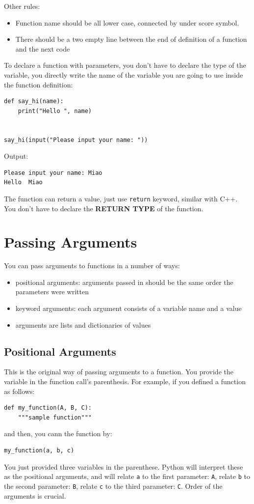 \documentclass[12pt]{book}
\begin{document}
Other rules:
\begin{itemize}
\item Function name should be all lower case, connected by under score symbol.
\item There should be a two empty line between the end of definition of a function and the next code
\end{itemize}

To declare a function with parameters, you don't have to declare the type of the variable, you directly write the name of the variable you are going to use inside the function definition:
\begin{verbatim}
def say_hi(name):
    print("Hello ", name)


say_hi(input("Please input your name: "))
\end{verbatim}
Output:
\begin{verbatim}
Please input your name: Miao
Hello  Miao
\end{verbatim}

The function can return a value, just use \texttt{return} keyword, similar with C++. You don't have to declare the \textbf{RETURN TYPE} of the function.
\section{Passing Arguments}
\label{sec:org0814f89}
You can pass arguments to functions in a number of ways:
\begin{itemize}
\item positional arguments: arguments passed in should be the same order the parameters were written
\item keyword arguments: each argument consists of a variable name and a value
\item arguments are lists and dictionaries of values
\end{itemize}

\subsection{Positional Arguments}
\label{sec:org8d702b7}
This is the original way of passing arguments to a function. You provide the variable in the function call's parenthesis. For example, if you defined a function as follows:
\begin{verbatim}
def my_function(A, B, C):
    """sample function"""
\end{verbatim}
and then, you cann the function by:
\begin{verbatim}
my_function(a, b, c)
\end{verbatim}
You just provided three variables in the parenthese. Python will interpret these as the positional arguments, and will relate \texttt{a} to the first parameter: \texttt{A}, relate \texttt{b} to the second parameter: \texttt{B}, relate \texttt{c} to the third parameter: \texttt{C}. Order of the arguments is crucial.
\end{document}
